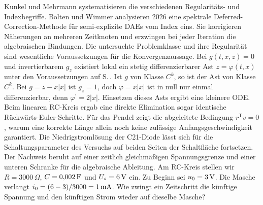 
Kunkel und Mehrmann systematisieren die verschiedenen Regularitäts- und Indexbegriffe. Bolten und Wimmer analysieren 2026 eine spektrale Deferred-Correction-Methode für semi-explizite DAEs vom Index eins. Sie korrigieren Näherungen an mehreren Zeitknoten und erzwingen bei jeder Iteration die algebraischen Bindungen. Die untersuchte Problemklasse und ihre Regularität sind wesentliche Voraussetzungen für die Konvergenzaussage.
Bei \(g(t,x,z)=0\) und invertierbarem \(g_z\) existiert lokal ein stetig differenzierbarer Ast \(z=\varphi(t,x)\) unter den Voraussetzungen auf S.\,. Ist \(g\) von Klasse \(C^k\), so ist der Ast von Klasse \(C^k\). Bei \(g=z-x|x|\) ist \(g_z=1\), doch \(\varphi=x|x|\) ist in null nur einmal differenzierbar, denn \(\varphi^{\prime}=2|x|\). Einsetzen dieses Asts ergibt eine kleinere ODE. Beim linearen RC-Kreis ergab eine direkte Elimination sogar identische Rückwärts-Euler-Schritte. Für das Pendel zeigt die abgeleitete Bedingung \(r^\mathsf Tv=0\), warum eine korrekte Länge allein noch keine zulässige Anfangsgeschwindigkeit garantiert.
Die Niedrigstromlösung der C21-Diode lässt sich für die Schaltungsparameter des Versuchs auf beiden Seiten der Schaltfläche fortsetzen. Der Nachweis beruht auf einer zeitlich gleichmäßigen Spannungsgrenze und einer unteren Schranke für die algebraische Ableitung.
Am RC-Kreis stellen wir \(R=3000\,\Omega\), \(C=0{,}002\,\mathrm{F}\) und \(U_s=6\,\mathrm{V}\) ein. Zu Beginn sei \(u_0=3\,\mathrm{V}\). Die Masche verlangt \(i_0=(6-3)/3000=1\,\mathrm{mA}\). Wie zwingt ein Zeitschritt die künftige Spannung und den künftigen Strom wieder auf dieselbe Masche?

